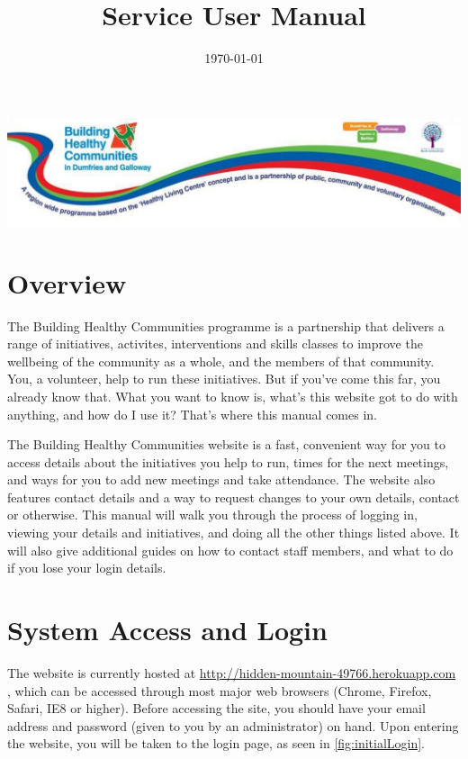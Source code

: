 \documentclass{bhcguides}
\begin{document}
\title{Service User Manual}
\includegraphics[width=1.0\textwidth]{BHCbanner.png}
\date{\today}
\maketitle

\tableofcontents

\section{Overview}

The Building Healthy Communities programme is a partnership that delivers a range of initiatives, activites, interventions and skills classes to improve the wellbeing of the community as a whole, and the members of that community. You, a volunteer, help to run these initiatives. But if you've come this far, you already know that. What you want to know is, what's this website got to do with anything, and how do I use it? That's where this manual comes in.

The Building Healthy Communities website is a fast, convenient way for you to access details about the initiatives you help to run, times for the next meetings, and ways for you to add new meetings and take attendance. The website also features contact details and a way to request changes to your own details, contact or otherwise. This manual will walk you through the process of logging in, viewing your details and initiatives, and doing all the other things listed above. It will also give additional guides on how to contact staff members, and what to do if you lose your login details.

\pagebreak

\section{System Access and Login}
\label{sec:syslogin}

The website is currently hosted at \url{http://hidden-mountain-49766.herokuapp.com} , which can be accessed through most major web browsers (Chrome, Firefox, Safari, IE8 or higher). Before accessing the site, you should have your email address and password (given to you by an administrator) on hand. Upon entering the website, you will be taken to the login page, as seen in \autoref{fig:initialLogin}.
\end{document}

